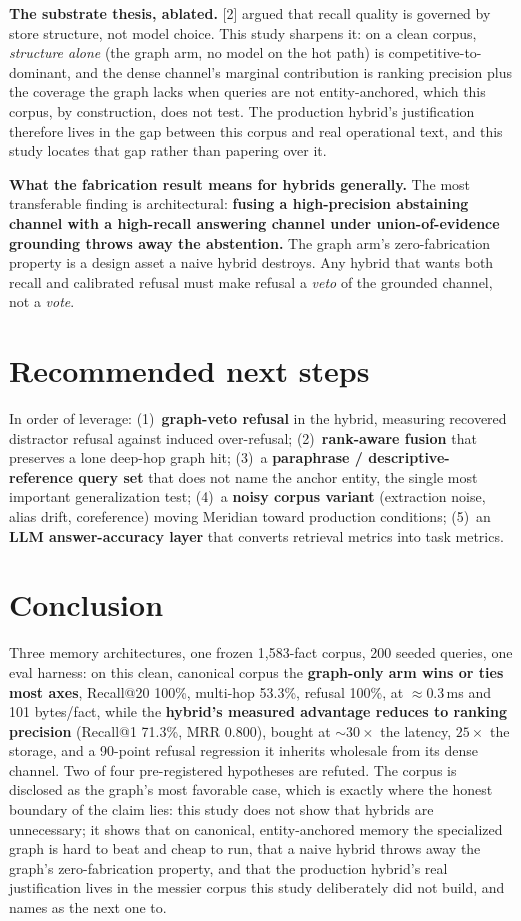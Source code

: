 \documentclass[11pt]{article}
\begin{document}
\textbf{The substrate thesis, ablated.} [2] argued that recall quality is governed by store
structure, not model choice. This study sharpens it: on a clean corpus, \emph{structure
alone} (the graph arm, no model on the hot path) is competitive-to-dominant, and the dense
channel's marginal contribution is ranking precision plus the coverage the graph lacks when
queries are not entity-anchored, which this corpus, by construction, does not test. The
production hybrid's justification therefore lives in the gap between this corpus and real
operational text, and this study locates that gap rather than papering over it.

\textbf{What the fabrication result means for hybrids generally.} The most transferable
finding is architectural: \textbf{fusing a high-precision abstaining channel with a
high-recall answering channel under union-of-evidence grounding throws away the abstention.}
The graph arm's zero-fabrication property is a design asset a naive hybrid destroys. Any
hybrid that wants both recall and calibrated refusal must make refusal a \emph{veto} of the
grounded channel, not a \emph{vote}.

\section{Recommended next steps}
In order of leverage: (1)~\textbf{graph-veto refusal} in the hybrid, measuring recovered
distractor refusal against induced over-refusal; (2)~\textbf{rank-aware fusion} that
preserves a lone deep-hop graph hit; (3)~a \textbf{paraphrase / descriptive-reference query
set} that does not name the anchor entity, the single most important generalization test;
(4)~a \textbf{noisy corpus variant} (extraction noise, alias drift, coreference) moving
Meridian toward production conditions; (5)~an \textbf{LLM answer-accuracy layer} that converts
retrieval metrics into task metrics.

\section{Conclusion}
Three memory architectures, one frozen 1{,}583-fact corpus, 200 seeded queries, one eval
harness: on this clean, canonical corpus the \textbf{graph-only arm wins or ties most
axes}, Recall@20 100\%, multi-hop 53.3\%, refusal 100\%, at $\approx$0.3\,ms and 101
bytes/fact, while the \textbf{hybrid's measured advantage reduces to ranking precision}
(Recall@1 71.3\%, MRR 0.800), bought at ${\sim}30\times$ the latency, $25\times$ the storage,
and a 90-point refusal regression it inherits wholesale from its dense channel. Two of four
pre-registered hypotheses are refuted. The corpus is disclosed as the graph's most favorable
case, which is exactly where the honest boundary of the claim lies: this study does not show
that hybrids are unnecessary; it shows that on canonical, entity-anchored memory the
specialized graph is hard to beat and cheap to run, that a naive hybrid throws away the
graph's zero-fabrication property, and that the production hybrid's real justification lives
in the messier corpus this study deliberately did not build, and names as the next one to.
\end{document}
